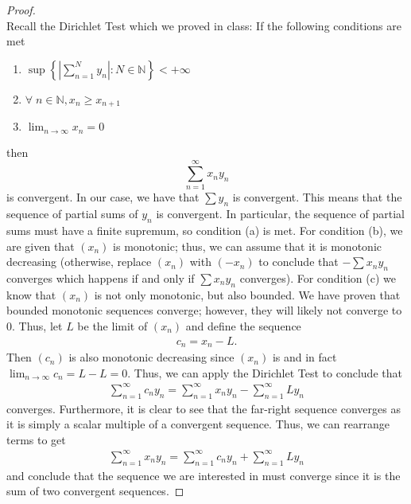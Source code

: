 \documentclass[10pt,a4paper]{article}
\theoremstyle{definition}
\theoremstyle{definition}
\begin{document}
\begin{proof}$ $
\\Recall the Dirichlet Test which we proved in class: If the following conditions are met
\begin{enumerate}[label = (\alph*)]
\item $\displaystyle \sup\left\{\left|\sum_{n = 1}^N y_n \right| : N \in \mathbb{N}\right\} < + \infty$
\item $\forall \; n \in \mathbb{N}, x_n \geq x_{n + 1}$
\item $\lim_{n \to \infty} x_n = 0$
\end{enumerate}
then $$\sum_{n =1}^\infty x_n y_n$$ is convergent. In our case, we have that $\sum y_n$ is convergent. This means that the sequence of partial sums of $y_n$ is convergent. In particular, the sequence of partial sums must have a finite supremum, so condition (a) is met. For condition (b), we are given that $(x_n)$ is monotonic; thus, we can assume that it is monotonic decreasing (otherwise, replace $(x_n)$ with $(-x_n)$ to conclude that $-\sum x_n y_n$ converges which happens if and only if $\sum x_n y_n$ converges). For condition (c) we know that $(x_n)$ is not only monotonic, but also bounded. We have proven that bounded monotonic sequences converge; however, they will likely not converge to 0. Thus, let $L$ be the limit of $(x_n)$ and define the sequence 
\begin{align*}
c_n = x_n - L.
\end{align*}
Then $(c_n)$ is also monotonic decreasing since $(x_n)$ is and in fact $\lim_{n \to \infty} c_n = L - L = 0$. Thus, we can apply the Dirichlet Test to conclude that 
\begin{align*}
\sum_{n = 1}^\infty c_n y_n = \sum_{n = 1}^\infty x_n y_n - \sum_{n = 1}^\infty L y_n
\end{align*}
converges. Furthermore, it is clear to see that the far-right sequence converges as it is simply a scalar multiple of a convergent sequence. Thus, we can rearrange terms to get
\begin{align*}
\sum_{n = 1}^\infty x_n y_n = \sum_{n = 1}^\infty c_n y_n  + \sum_{n = 1}^\infty L y_n
\end{align*}
and conclude that the sequence we are interested in must converge since it is the sum of two convergent sequences. 
\end{proof}
\end{document}
